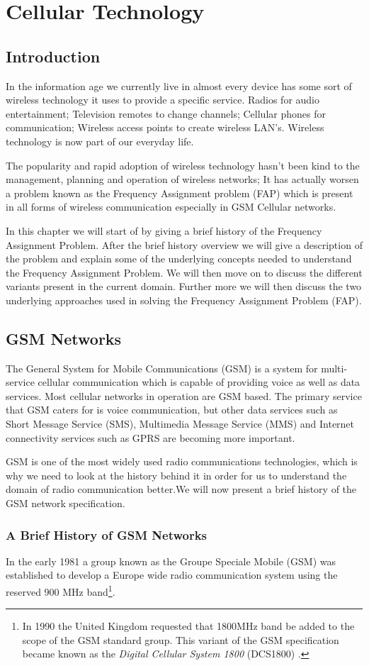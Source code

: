 \chapter{Cellular Technology}
\section{Introduction}
In the information age we currently live in almost every device has some sort of wireless technology it uses to provide a specific service. Radios for audio entertainment; Television remotes to change 
channels; Cellular phones for communication; Wireless access points to create wireless LAN's\cite{Karen2004}. Wireless technology is now part of our everyday life.

The popularity and rapid adoption of wireless technology hasn't been kind to the management, planning and operation of wireless networks; It has actually worsen a problem known as the Frequency Assignment problem (FAP) which is present in all forms of wireless communication especially in GSM Cellular networks.

In this chapter we will start of by giving a brief history of the Frequency Assignment Problem. After the brief history overview we will give a description of the problem and explain some of the
underlying concepts needed to understand the Frequency Assignment Problem. We will then move on to discuss the different variants present in the current domain. Further more we will
then discuss the two underlying approaches used in solving the Frequency Assignment Problem (FAP).
\section{GSM Networks}
The General System for Mobile Communications (GSM) is a system for multi-service cellular communication which is capable of providing voice as well as data services. Most cellular networks in operation 
are GSM based. The primary service that GSM caters for is voice communication, but other data services such as Short Message Service (SMS), Multimedia Message Service (MMS) and Internet 
connectivity services such as GPRS are becoming more important\cite{Eisenblatter}.

GSM is one of the most widely used radio communications technologies, which is why we need to look at the history behind it in order for us to understand the domain of radio communication better.We will now present a brief history of the GSM network specification.
\subsection{A Brief History of GSM Networks}
In the early 1981 a group known as the Groupe Speciale Mobile (GSM) was established to develop a Europe wide radio communication system using the reserved 900 MHz band\footnote{In 1990 the United Kingdom requested that 1800MHz band be added to the scope of the GSM standard group. This variant of the GSM specification became known as the \emph{Digital Cellular System 1800} (DCS1800) \cite{GSM92}.}.

